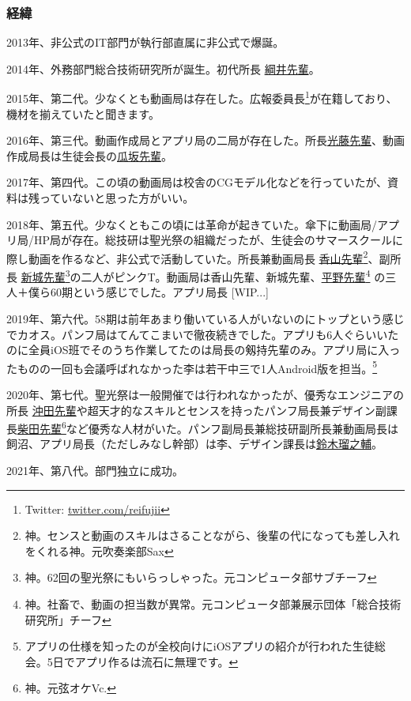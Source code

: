 \documentclass[dvipdfmx,jb5]{jarticle}
\newcommand{\mail}[2]{\href{mailto:#2}{#1}}
\begin{document}
\subsubsection{経緯}
2013年、非公式のIT部門が執行部直属に非公式で爆誕。

2014年、外務部門総合技術研究所が誕生。初代所長 \mail{綱井先輩}{53127tsunai@seiko.ac.jp}。

2015年、第二代。少なくとも動画局は存在した。広報委員長\footnote{Twitter: \url{twitter.com/reifujii}}が在籍しており、機材を揃えていたと聞きます。

2016年、第三代。動画作成局とアプリ局の二局が存在した。所長\mail{光藤先輩}{55201mitsudo@seiko.ac.jp}、動画作成局長は生徒会長の\mail{瓜坂先輩}{55031urisaka@seiko.ac.jp}。

2017年、第四代。この頃の動画局は校舎のCGモデル化などを行っていたが、資料は残っていないと思った方がいい。

2018年、第五代。少なくともこの頃には革命が起きていた。傘下に動画局/アプリ局/HP局が存在。総技研は聖光祭の組織だったが、生徒会のサマースクールに際し動画を作るなど、非公式で活動していた。所長兼動画局長 \mail{香山先輩}{57084koyama@seiko.ac.jp}\footnote{神。センスと動画のスキルはさることながら、後輩の代になっても差し入れをくれる神。元吹奏楽部Sax}、副所長 \mail{新城先輩}{57011araki@seiko.ac.jp}\footnote{神。62回の聖光祭にもいらっしゃった。元コンピュータ部サブチーフ}の二人がピンクT。動画局は香山先輩、新城先輩、\mail{平野先輩}{57174hirano@seiko.ac.jp}\footnote{ 神。社畜で、動画の担当数が異常。元コンピュータ部兼展示団体「総合技術研究所」チーフ} の三人＋僕ら60期という感じでした。アプリ局長 [WIP...]

2019年、第六代。58期は前年あまり働いている人がいないのにトップという感じでカオス。パンフ局はてんてこまいで徹夜続きでした。アプリも6人ぐらいいたのに全員iOS班でそのうち作業してたのは局長の剱持先輩のみ。アプリ局に入ったものの一回も会議呼ばれなかった李は若干中三で1人Android版を担当。\footnote{アプリの仕様を知ったのが全校向けにiOSアプリの紹介が行われた生徒総会。5日でアプリ作るは流石に無理です。}

2020年、第七代。聖光祭は一般開催では行われなかったが、優秀なエンジニアの所長 \mail{沖田先輩}{59039okita@seiko.ac.jp}や超天才的なスキルとセンスを持ったパンフ局長兼デザイン副課長\mail{柴田先輩}{59091shibataseiko.ac.jp}\footnote{神。元弦オケVc.}など優秀な人材がいた。パンフ副局長兼総技研副所長兼動画局長は飼沼、アプリ局長（ただしみなし幹部）は李、デザイン課長は\mail{鈴木瑠之輔}{60111suzuki@seiko.ac.jp}。

2021年、第八代。部門独立に成功。
\end{document}
